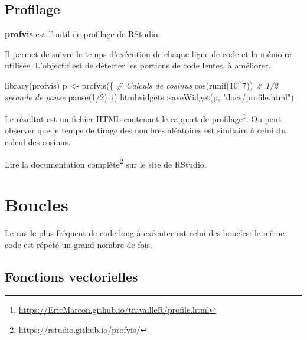 \documentclass[
  11pt,
  french,
  a4paper,
  extrafontsizes,onecolumn,openright
  ]{memoir}
\newenvironment{Shaded}{\begin{snugshade}}{\end{snugshade}}
\newcommand{\CommentTok}[1]{\textcolor[rgb]{0.56,0.35,0.01}{\textit{#1}}}
\newcommand{\DecValTok}[1]{\textcolor[rgb]{0.00,0.00,0.81}{#1}}
\newcommand{\FunctionTok}[1]{\textcolor[rgb]{0.00,0.00,0.00}{#1}}
\newcommand{\NormalTok}[1]{#1}
\newcommand{\OtherTok}[1]{\textcolor[rgb]{0.56,0.35,0.01}{#1}}
\newcommand{\SpecialCharTok}[1]{\textcolor[rgb]{0.00,0.00,0.00}{#1}}
\newcommand{\StringTok}[1]{\textcolor[rgb]{0.31,0.60,0.02}{#1}}
\begin{document}
\normalsize

\hypertarget{profilage}{%
\subsection{Profilage}\label{profilage}}

\textbf{profvis} est l'outil de profilage de RStudio.

Il permet de suivre le temps d'exécution de chaque ligne de code et la mémoire utilisée.
L'objectif est de détecter les portions de code lentes, à améliorer.

\scriptsize

\begin{Shaded}
\begin{Highlighting}[]
\FunctionTok{library}\NormalTok{(profvis)}
\NormalTok{p }\OtherTok{\textless{}{-}} \FunctionTok{profvis}\NormalTok{(\{}
    \CommentTok{\# Calculs de cosinus}
    \FunctionTok{cos}\NormalTok{(}\FunctionTok{runif}\NormalTok{(}\DecValTok{10}\SpecialCharTok{\^{}}\DecValTok{7}\NormalTok{))}
    \CommentTok{\# 1/2 seconde de pause}
    \FunctionTok{pause}\NormalTok{(}\DecValTok{1}\SpecialCharTok{/}\DecValTok{2}\NormalTok{)}
\NormalTok{\})}
\NormalTok{htmlwidgets}\SpecialCharTok{::}\FunctionTok{saveWidget}\NormalTok{(p, }\StringTok{"docs/profile.html"}\NormalTok{)}
\end{Highlighting}
\end{Shaded}

\normalsize

Le résultat est un fichier HTML contenant le rapport de profilage\footnote{\url{https://EricMarcon.github.io/travailleR/profile.html}}.
On peut observer que le temps de tirage des nombres aléatoires est similaire à celui du calcul des cosinus.

Lire la documentation complète\footnote{\url{https://rstudio.github.io/profvis/}} sur le site de RStudio.

\hypertarget{boucles}{%
\section{Boucles}\label{boucles}}

Le cas le plus fréquent de code long à exécuter est celui des boucles: le même code est répété un grand nombre de fois.

\hypertarget{fonctions-vectorielles}{%
\subsection{Fonctions vectorielles}\label{fonctions-vectorielles}}
\end{document}
